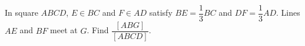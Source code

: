 In square $ABCD$, $E\in BC$ and $F\in AD$ satisfy $BE=\dfrac{1}{3}BC$ and $DF=\dfrac{1}{3}AD$. Lines $AE$ and $BF$ meet at $G$. Find $\dfrac{[ABG]}{[ABCD]}$.
